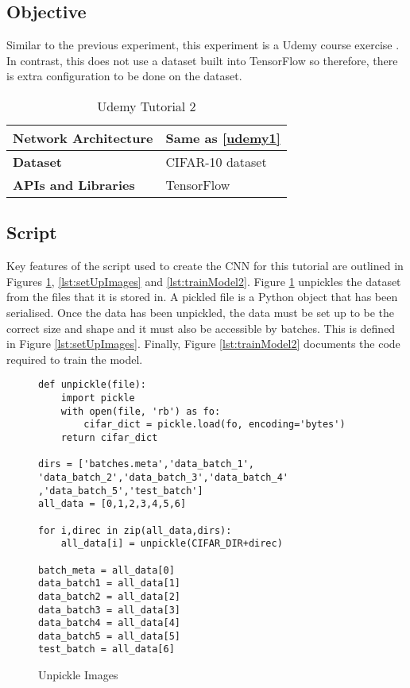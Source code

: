 \tocless\subsection{Objective}
Similar to the previous experiment, this experiment is a Udemy course exercise \parencite{udemy}. In contrast, this does not use a dataset built into TensorFlow so therefore, there is extra configuration to be done on the dataset.

\begin{table}[h]
\centering
\caption{Udemy Tutorial 2}
\label{my-label}
\begin{tabular}{|l|p{8cm}|}
\hline
\textbf{Network Architecture} & Same as \ref{udemy1}            \\ \hline
\textbf{Dataset}              & CIFAR-10 dataset \\ \hline
\textbf{APIs and Libraries}   & TensorFlow                                                         \\ \hline
\end{tabular}
\end{table}

\tocless\subsection{Script}
Key features of the script used to create the CNN for this tutorial are outlined in Figures \ref{lst:unpickle}, \ref{lst:setUpImages} and \ref{lst:trainModel2}.
Figure \ref{lst:unpickle} unpickles the dataset from the files that it is stored in.
A pickled file is a Python object that has been serialised.
Once the data has been unpickled, the data must be set up to be the correct size and shape and it must also be accessible by batches.
This is defined in Figure \ref{lst:setUpImages}.
Finally, Figure \ref{lst:trainModel2} documents the code required to train the model.

\begin{figure}[h]
\caption{Unpickle Images \parencite{udemy}}
\label{lst:unpickle}
\begin{lstlisting}[style=Python]
def unpickle(file):
    import pickle
    with open(file, 'rb') as fo:
        cifar_dict = pickle.load(fo, encoding='bytes')
    return cifar_dict

dirs = ['batches.meta','data_batch_1',
'data_batch_2','data_batch_3','data_batch_4'
,'data_batch_5','test_batch']
all_data = [0,1,2,3,4,5,6]

for i,direc in zip(all_data,dirs):
    all_data[i] = unpickle(CIFAR_DIR+direc)

batch_meta = all_data[0]
data_batch1 = all_data[1]
data_batch2 = all_data[2]
data_batch3 = all_data[3]
data_batch4 = all_data[4]
data_batch5 = all_data[5]
test_batch = all_data[6]
\end{lstlisting}
\end{figure}

